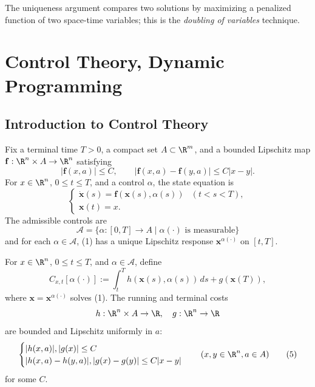 \begin{remark}
\label{rem:doubling-variables-technique}
The uniqueness argument compares two solutions by maximizing a penalized function of two space-time variables; this is the \textit{doubling of variables} technique.
\end{remark}

\section{Control Theory, Dynamic Programming}
\label{sec:hj-control-theory-dynamic-programming}

\subsection{Introduction to Control Theory}

\begin{definition}
\label{def:controlled-ode-admissible-controls}
Fix a terminal time $T>0$, a compact set $A\subset\R^m$, and a bounded Lipschitz map $\mathbf f:\R^n\times A\to\R^n$ satisfying
\[
|\mathbf f(x,a)|\leq C,
\qquad
|\mathbf f(x,a)-\mathbf f(y,a)|\leq C|x-y|.
\tag{3}
\]
For $x\in\R^n$, $0\leq t\leq T$, and a control $\alpha$, the state equation is
\[
\begin{cases}
\dot{\mathbf x}(s)=\mathbf f(\mathbf x(s),\alpha(s)) & (t<s<T),\\
\mathbf x(t)=x.
\end{cases}
\tag{1}
\]
The admissible controls are
\[
\mathcal{A} = \{\alpha : [0,T] \to A \mid \alpha(\cdot) \text{ is measurable}\}
\tag{2}
\]
and for each $\alpha\in\mathcal A$, (1) has a unique Lipschitz response $\mathbf x^{\alpha(\cdot)}$ on $[t,T]$.
\end{definition}

\begin{definition}
\label{def:control-cost-functional}
For $x\in\R^n$, $0\leq t\leq T$, and $\alpha\in\mathcal A$, define
\[
C_{x,t}[\alpha(\cdot)] := \int_t^T h(\mathbf x(s), \alpha(s)) \, ds + g(\mathbf x(T)),
\tag{4}
\]
where $\mathbf x=\mathbf x^{\alpha(\cdot)}$ solves (1). The running and terminal costs
\[
h : \R^n \times A \to \R, \quad g : \R^n \to \R
\]
are bounded and Lipschitz uniformly in $a$:
\[
\begin{cases} |h(x, a)|, |g(x)| \le C \\ |h(x, a) - h(y, a)|, |g(x) - g(y)| \le C|x - y| \end{cases} \quad (x, y \in \R^n, a \in A)
\tag{5}
\]
for some $C$.
\end{definition}

